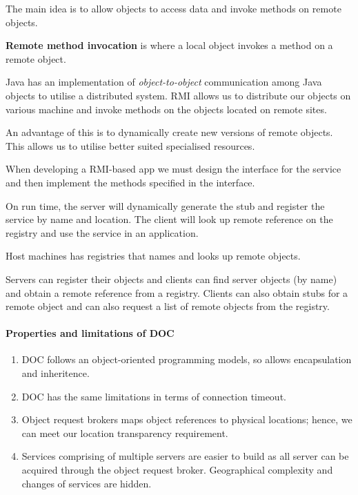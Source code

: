\begin{remark}
    The main idea is to allow objects to access data
    and invoke methods on remote objects.
\end{remark}

\begin{definition}
    \textbf{Remote method invocation} is where a local object
    invokes a method on a remote object.
\end{definition}

\begin{example}
    Java has an implementation of \emph{object-to-object} communication
    among Java objects to utilise a distributed system.
    RMI allows us to distribute our objects on various machine
    and invoke methods on the objects located on remote
    sites.
    
    An advantage of this is to dynamically create new versions
    of remote objects. 
    This allows us to utilise better suited specialised resources.
\end{example}

When developing a RMI-based app we must design the
interface for the service and then implement the methods specified
in the interface.

On run time, the server will dynamically generate the stub and
register the service by name and location.
The client will look up remote reference on the registry and
use the service in an application.

Host machines has registries that names and looks up remote objects.

Servers can register their objects and clients can find server
objects (by name) and obtain a remote reference from a registry.
Clients can also obtain stubs for a remote object and can also
request a list of remote objects from the registry.

\paragraph{Properties and limitations of DOC}
\begin{enumerate}
    \item 
        DOC follows an object-oriented programming models,
        so allows encapsulation and inheritence.

    \item  
        DOC has the same limitations in terms of connection timeout.

    \item 
        Object request brokers maps object references
        to physical locations; hence, we can meet our location
        transparency requirement.

    \item 
        Services comprising of multiple servers are easier to build
        as all server can be acquired through the object request
        broker.
        Geographical complexity and changes of services are hidden.
\end{enumerate}
